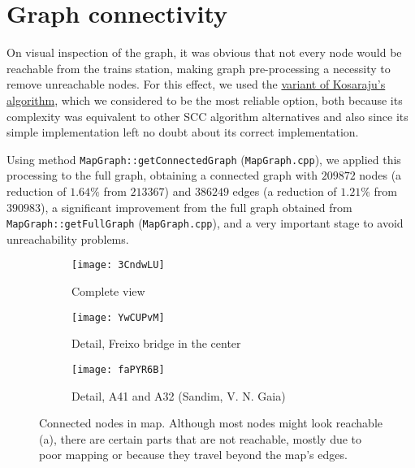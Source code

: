 \chapter{Graph connectivity} \label{connectivity-graphs}
On visual inspection of the graph, it was obvious that not every node would be reachable from the trains station, making graph pre-processing a necessity to remove unreachable nodes.
For this effect, we used the \hyperref[algorithm-scc-kosaraju-v]{variant of Kosaraju's algorithm}, which we considered to be the most reliable option, both because its complexity was equivalent to other \acrshort{SCC} algorithm alternatives and also since its simple implementation left no doubt about its correct implementation.\par
Using method \texttt{MapGraph::getConnectedGraph} (\texttt{MapGraph.cpp}), we applied this processing to the full graph, obtaining a connected graph with $209872$ nodes (a reduction of $1.64\%$ from $213367$) and $386249$ edges (a reduction of $1.21\%$ from $390983$), a significant improvement from the full graph obtained from \texttt{MapGraph::getFullGraph} (\texttt{MapGraph.cpp}), and a very important stage to avoid unreachability problems.
\begin{figure}[h]
    \centering
    \begin{subfigure}{.50\textwidth}
        \centering
        \texttt{[image: 3CndwLU]}
        \caption{Complete view}
    \end{subfigure}
    \begin{subfigure}{.49\textwidth}
        \centering
        \texttt{[image: YwCUPvM]}
        \caption{Detail, Freixo bridge in the center}
        \vspace{0.6em}
        \texttt{[image: faPYR6B]}
        \caption{Detail, A41 and A32 (Sandim, V. N. Gaia)}
    \end{subfigure}
    \caption{Connected nodes in map. Although most nodes might look reachable (a), there are certain parts that are not reachable, mostly due to poor mapping or because they travel beyond the map's edges.}
\end{figure}
